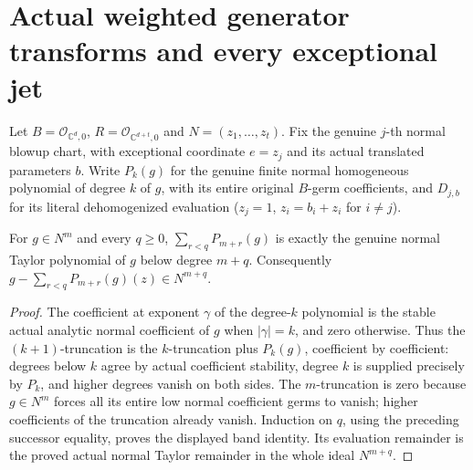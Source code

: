 \section{Actual weighted generator transforms and every exceptional jet}
\label{sec:hironaka-actual-weighted-generator-transform-jets}
Let $B=\mathcal O_{\mathbb C^d,0}$, $R=\mathcal O_{\mathbb C^{d+t},0}$ and $N=(z_1,\ldots,z_t)$.
Fix the genuine $j$-th normal blowup chart, with exceptional coordinate $e=z_j$ and its actual translated parameters $b$.
Write $P_k(g)$ for the genuine finite normal homogeneous polynomial of degree $k$ of $g$, with its entire original $B$-germ coefficients, and $D_{j,b}$ for its literal dehomogenized evaluation ($z_j=1$, $z_i=b_i+z_i$ for $i\ne j$).

\begin{theorem}
\label{hir:actual-weighted-transform-normal-band}
\leanok
For $g\in N^m$ and every $q\ge0$,
$\sum_{r<q}P_{m+r}(g)$ is exactly the genuine normal Taylor polynomial of $g$ below degree $m+q$.
Consequently $g-\sum_{r<q}P_{m+r}(g)(z)\in N^{m+q}$.
\end{theorem}
\begin{proof}
The coefficient at exponent $\gamma$ of the degree-$k$ polynomial is the stable actual analytic normal coefficient of $g$ when $|\gamma|=k$, and zero otherwise.
Thus the $(k+1)$-truncation is the $k$-truncation plus $P_k(g)$, coefficient by coefficient: degrees below $k$ agree by actual coefficient stability, degree $k$ is supplied precisely by $P_k$, and higher degrees vanish on both sides.
The $m$-truncation is zero because $g\in N^m$ forces all its entire low normal coefficient germs to vanish; higher coefficients of the truncation already vanish.
Induction on $q$, using the preceding successor equality, proves the displayed band identity.
Its evaluation remainder is the proved actual normal Taylor remainder in the whole ideal $N^{m+q}$.
\end{proof}

